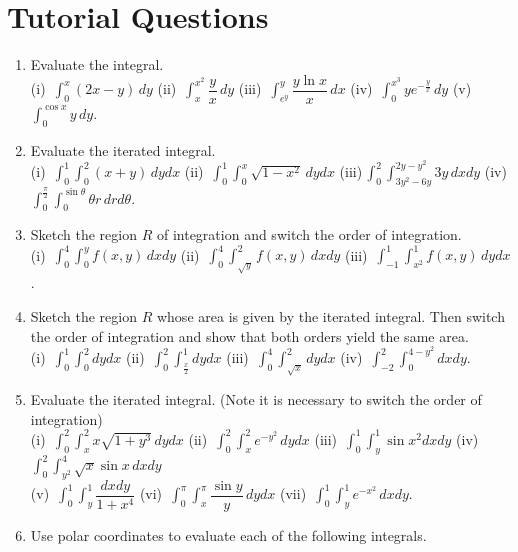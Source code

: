 \documentclass[titlepage,a4paper,12pt]{report}
\begin{document}
\section{Tutorial Questions}
\begin{enumerate}
\item Evaluate the integral.\\
(i)\, $\displaystyle \int _0^x (2x-y)\, dy$ \quad (ii)\, $\displaystyle \int _x^{x^2} \dfrac{y}{x}\, dy$ \quad (iii)\,  $\displaystyle \int _{e^y}^y \dfrac{y\ln x}{x}\, dx$ \quad (iv)\, $\displaystyle \int _0^{x^3} ye^{-\frac{y}{x}}\, dy$ \quad (v)\, $\displaystyle \int _0^{\cos x} y\, dy$.
\item Evaluate the iterated integral.\\
(i)\, $\displaystyle \int _0^1\int _0^2 (x+y)\, dydx$ \quad (ii)\, $\displaystyle \int _0^1\int _0^x \sqrt{1-x^2}\, dydx$ \quad (iii)\,$\displaystyle \int _0^2\int _{3y^2-6y}^{2y-y^2} 3y\, dxdy$ \quad (iv)\, $\displaystyle \int _0^{\frac{\pi}{2}}\int _0^{\sin \theta} \theta r\, drd\theta$.
\item Sketch the region $R$ of integration and switch the order of integration.\\
(i)\, $\displaystyle \int _0^4\int _0^y f(x,y)\, dxdy$ \quad (ii)\, $\displaystyle \int _0^4 \int _{\sqrt{y}}^2 f(x,y)\, dxdy$ \quad (iii)\, $\displaystyle \int _{-1}^1\int _{x^2}^1 f(x,y)\, dydx$.
\item Sketch the region $R$ whose area is given by the iterated integral. Then switch the order of integration and show that both orders yield the same area.\\
(i)\, $\displaystyle \int _0^1\int _0^2 dydx$ \quad (ii)\, $\displaystyle \int _0^2\int _{\frac{x}{2}}^1 dydx$ \quad (iii)\, $\displaystyle \int _0^4\int _{\sqrt{x}}^2 dydx$ \quad  (iv)\, $\displaystyle \int _{-2}^2 \int _0^{4-y^2}dxdy$.
\item Evaluate the iterated integral. (Note it is necessary to switch the order of integration)\\
(i)\, $\displaystyle \int _0^2\int _x^2 x\sqrt{1+y^3}\, dydx$ \quad (ii)\, $\displaystyle \int _0^2\int _x^2 e^{-y^2}\, dydx$ \quad (iii)\, $\displaystyle \int _0^1\int _y^1 \sin x^2 dxdy$ \quad (iv)\, $\displaystyle \int _0^2\int _{y^2}^4 \sqrt{x}\sin x \, dxdy$ \\ (v)\, $\displaystyle \int _0^1 \int _y^1 \dfrac{dxdy}{1+x^4}$ \quad (vi)\, $\displaystyle \int _0^\pi \int _x^\pi \dfrac{\sin y}{y}\, dydx$ \quad (vii)\, $\displaystyle \int _0^1\int _y^1 e^{-x^2}\, dxdy$.
\item Use polar coordinates to evaluate each of the following integrals.\\

\end{enumerate}
\end{document}
